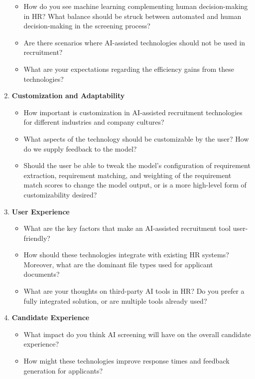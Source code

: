 \documentclass[draft,final]{thesisclass} %
\begin{document}
\begin{enumerate}
    \begin{itemize}
        \item How do you see machine learning complementing human decision-making in \acs{HR}? What balance should be struck between automated and human decision-making in the screening process?
        \item Are there scenarios where \acs{AI}-assisted technologies should not be used in recruitment?
        \item What are your expectations regarding the efficiency gains from these technologies?
    \end{itemize}
    \item \textbf{Customization and Adaptability}
    \begin{itemize}
        \item How important is customization in \acs{AI}-assisted recruitment technologies for different industries and company cultures?
        \item What aspects of the technology should be customizable by the user? How do we supply feedback to the model?
        \item Should the user be able to tweak the model's configuration of requirement extraction, requirement matching, and weighting of the requirement match scores to change the model output, or is a more high-level form of customizability desired?
    \end{itemize}
    \item \textbf{User Experience}
    \begin{itemize}
        \item What are the key factors that make an \acs{AI}-assisted recruitment tool user-friendly?
        \item How should these technologies integrate with existing \acs{HR} systems? Moreover, what are the dominant file types used for applicant documents?
        \item What are your thoughts on third-party \acs{AI} tools in \acs{HR}? Do you prefer a fully integrated solution, or are multiple tools already used?
    \end{itemize}
    \item \textbf{Candidate Experience}
    \begin{itemize}
        \item What impact do you think \acs{AI} screening will have on the overall candidate experience?
        \item How might these technologies improve response times and feedback generation for applicants?

\end{itemize}
\end{enumerate}
\end{document}
